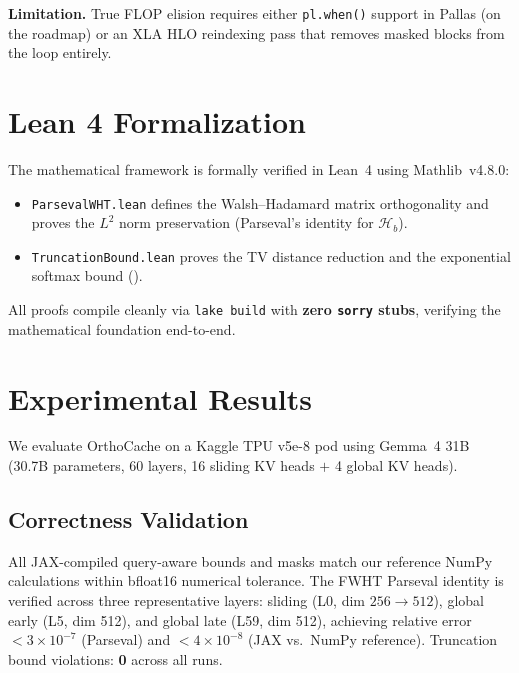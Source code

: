 \documentclass[conference,10pt]{IEEEtran}
\begin{document}
\noindent\textbf{Limitation.} True FLOP elision requires either
\texttt{pl.when()} support in Pallas (on the roadmap) or an XLA HLO
reindexing pass that removes masked blocks from the loop entirely.

\section{Lean 4 Formalization}\label{sec:lean}

The mathematical framework is formally verified in Lean~4 using Mathlib~v4.8.0:

\begin{itemize}
    \item \texttt{ParsevalWHT.lean} defines the Walsh--Hadamard matrix
          orthogonality and proves the $L^2$ norm preservation (Parseval's
          identity for $\mathcal{H}_b$).
    \item \texttt{TruncationBound.lean} proves the TV distance reduction
          and the exponential softmax bound ().
\end{itemize}

All proofs compile cleanly via \texttt{lake build} with \textbf{zero
\texttt{sorry} stubs}, verifying the mathematical foundation end-to-end.

\section{Experimental Results}\label{sec:results}

We evaluate OrthoCache on a Kaggle TPU v5e-8 pod using Gemma~4 31B
(30.7B parameters, 60 layers, 16 sliding KV heads $+$ 4 global KV heads).

\subsection{Correctness Validation}

All JAX-compiled query-aware bounds and masks match our reference NumPy
calculations within bfloat16 numerical tolerance. The FWHT Parseval identity
is verified across three representative layers: sliding (L0, dim $256 \to 512$),
global early (L5, dim 512), and global late (L59, dim 512), achieving
relative error $< 3 \times 10^{-7}$ (Parseval) and $< 4 \times 10^{-8}$
(JAX vs.\ NumPy reference). Truncation bound violations: \textbf{0}
across all runs.
\end{document}
